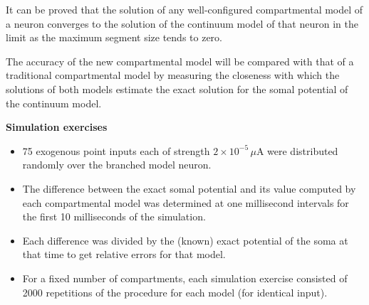 \documentclass{slides}
\begin{document}
%
%
\begin{slide}
It can be proved that the solution of any well-configured
compartmental model of a neuron converges to the solution of the
continuum model of that neuron in the limit as the maximum segment
size tends to zero.

The accuracy of the new compartmental model will be compared with
that of a traditional compartmental model by measuring the
closeness with which the solutions of both models estimate the
exact solution for the somal potential of the continuum model.
\end{slide}

%
%
\begin{slide}
\centerline{\textbf{Simulation exercises}}

\begin{itemize}
\item 75 exogenous point inputs each of strength
$2\times10^{-5}\,\mu$A were distributed randomly over the branched
model neuron.

\item The difference between the exact somal potential and its
value computed by each compartmental model was determined at one
millisecond intervals for the first 10 milliseconds of the
simulation.

\item  Each difference was divided by the (known) exact potential
of the soma at that time to get relative errors for that model.

\item For a fixed number of compartments, each simulation exercise
consisted of 2000 repetitions of the procedure for each model (for
identical input).
\end{itemize}
\end{slide}
\end{document}
